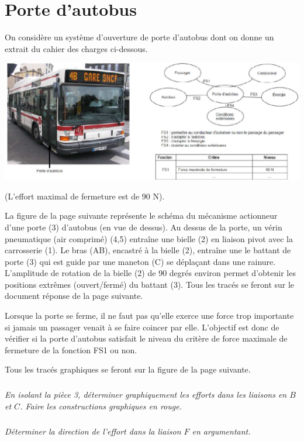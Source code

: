 \documentclass[10pt]{article}
\begin{document}
\newpage



\section*{Porte d'autobus}
\setcounter{subparagraph}{0}
On considère un système d'ouverture de porte d'autobus dont on donne un extrait du cahier des charges ci-dessous.

\begin{center}
\includegraphics[width=.9\textwidth]{images/img1.png}
\end{center}

(L'effort maximal de fermeture est de 90\; N).

La figure de la page suivante représente le schéma du mécanisme actionneur d'une porte (3) d'autobus (en vue de dessus). Au dessus de la porte, un vérin pneumatique (air comprimé) (4,5) entraîne une bielle (2) en liaison pivot avec la carrosserie (1). Le bras (AB), encastré à la bielle (2), entraîne une le battant de porte (3) qui est guide par une maneton (C) se déplaçant dans une rainure. L'amplitude de rotation de la bielle (2) de 90 degrés environ permet d'obtenir les positions extrêmes (ouvert/fermé) du battant (3). Tous les tracés se feront sur le document réponse de la page suivante. 

Lorsque la porte se ferme, il ne faut pas qu'elle exerce une force trop importante si jamais un passager venait à se faire coincer par elle. L'objectif est donc de vérifier si la porte d'autobus satisfait le niveau du critère de force maximale de fermeture de la fonction FS1 ou non.

Tous les tracés graphiques se feront sur la figure de la page suivante. 

\subparagraph{}
\textit{En isolant la pièce 3, déterminer graphiquement les efforts dans les liaisons en $B$ et $C$. Faire les constructions graphiques en rouge.}

\subparagraph{}
\textit{Déterminer la direction de l'effort dans la liaison $F$ en argumentant.}
\end{document}
